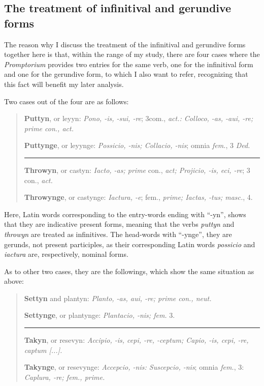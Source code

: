 \documentclass[output=paper,colorlinks,citecolor=brown,arabicfont,chinesefont]{langscibook}
\begin{document}
\subsection{The treatment of infinitival and gerundive forms}

The reason why I discuss the treatment of the infinitival and gerundive forms together here is that, within the range of my study, there are four cases where the \emph{Promptorium} provides two entries for the same verb, one for the infinitival form and one for the gerundive form, to which I also want to refer, recognizing that this fact will benefit my later analysis.

Two cases out of the four are as follows:

\begin{quote}
    \textbf{Puttyn}, or leyyn: \emph{Pono, -is, -sui, -re}; 3com., \emph{act.: Colloco, -as, -aui, -re; prime con., act.}
    
    \textbf{Puttynge}, or leyynge: \emph{Possicio, -nis; Collacio, -nis}; omnia \emph{fem.}, 3 \emph{Ded.}
    
    \rule{5cm}{.5pt}
    
    \textbf{Throwyn}, or castyn: \emph{Iacto, -as; prime} con., \emph{act; Projicio, -is, eci, -re}; 3 con., \emph{act.}
    
    \textbf{Throwynge}, or castynge: \emph{Iactura, -e}; fem., \emph{prime; Iactas, -tus; masc.}, 4.
\end{quote}

Here, Latin words corresponding to the entry-words ending with “-yn”, shows that they are indicative present forms, meaning that the verbs \emph{puttyn} and \emph{throwyn} are treated as infinitives. The head-words with “-ynge”, they are gerunds, not present participles, as their corresponding Latin words \emph{possicio} and \emph{iactura} are, respectively, nominal forms.

As to other two cases, they are the followings, which show the same situation as above:

\begin{quote}
    \textbf{Settyn} and plantyn: \emph{Planto, -as, aui, -re; prime con., neut.}
    
    \textbf{Settynge}, or plantynge: \emph{Plantacio, -nis; fem.} 3.

    \rule{5cm}{.5pt}

    \textbf{Takyn}, or resevyn: \emph{Accipio, -is, cepi, -re, -ceptum; Capio, -is, cepi, -re, captum [...].}
    
    \textbf{Takynge}, or resevynge: \emph{Accepcio, -nis: Suscepcio, -nis}; omnia \emph{fem.}, 3: \emph{Caplura, -re; fem., prime.}
\end{quote}
\end{document}
